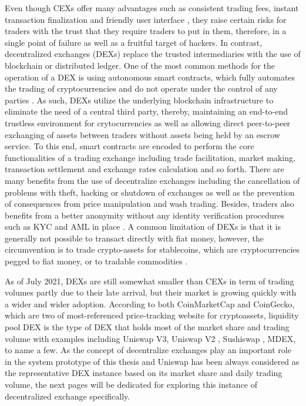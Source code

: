 Even though CEXs offer many advantages such as consistent trading fees, instant transaction finalization and friendly user interface \cite{lo2020uniswap}, they raise certain risks for traders with the trust that they require traders to put in them, therefore, in a single point of failure as well as a fruitful target of hackers. In contrast, decentralized exchanges (DEXs) replace the trusted intermediaries with the use of blockchain or distributed ledger. One of the most common methods for the operation of a DEX is using autonomous smart contracts, which fully automates the trading of cryptocurrencies and do not operate under the control of any parties \cite{wikiDEX}. As such, DEXs utilize the underlying blockchain infrastructure to eliminate the need of a central third party, thereby, maintaining an end-to-end trustless environment for crytocurrencies as well as allowing direct peer-to-peer exchanging of assets between traders without assets being held by an escrow service. To this end, smart contracts are encoded to perform the core functionalities of a trading exchange including trade facilitation, market making, transaction settlement and exchange rates calculation and so forth. There are many benefits from the use of decentralize exchanges including the cancellation of problems with theft, hacking or shutdown of exchanges as well as the prevention of consequences from price manipulation and wash trading. Besides, traders also benefits from a better anonymity without any identity verification procedures such as KYC and AML in place \cite{wikiDEX}. A common limitation of DEXs is that it is generally not possible to transact directly with fiat money, however, the circumvention is to trade crypto-assets for stablecoins, which are cryptocurrencies pegged to fiat money, or to tradable commodities \cite{mita2019stablecoin}. 

As of July 2021, DEXs are still somewhat smaller than CEXs in term of trading volumes partly due to their late arrival, but their market is growing quickly with a wider and wider adoption. According to both CoinMarketCap and CoinGecko, which are two of most-referenced price-tracking website for cryptoassets, liquidity pool DEX is the type of DEX that holds most of the market share and trading volume with examples including Uniswap V3, Uniswap V2 , Sushiswap , MDEX, to name a few. As the concept of decentralize exchanges play an important role in the system prototype of this thesis and Uniswap has been always considered as the representative DEX instance based on its market share and daily trading volume, the next pages will be dedicated for exploring this instance of decentralized exchange specifically.


